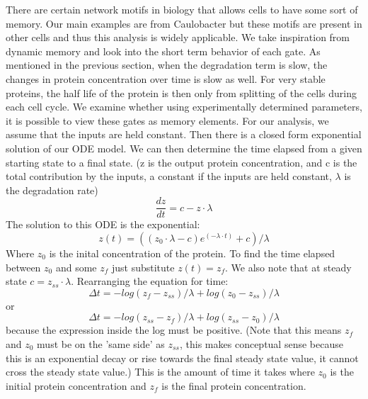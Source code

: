 \documentclass{article}
\begin{document}
There are certain network motifs in biology that allows cells to have some sort of memory.  Our main examples are from Caulobacter but these motifs are present in other cells and thus this analysis is widely applicable.  
We take inspiration from dynamic memory and look into the short term behavior of each gate.  As mentioned in the previous section, when the degradation term is slow, the changes in protein concentration over time is slow as well.  For very stable proteins, the half life of the protein is then only from splitting of the cells during each cell cycle.  We examine whether using experimentally determined parameters, it is possible to view these gates as memory elements.  For our analysis, we assume that the inputs are held constant.  Then there is a closed form exponential solution of our ODE model.  We can then determine the time elapsed from a given starting state to a final state.  (z is the output protein concentration, and c is the total contribution by the inputs, a constant if the inputs are held constant, $\lambda$ is the degradation rate)
\[\frac{dz}{dt}=c-z\cdot\lambda
\]
The solution to this ODE is the exponential:
\[z(t)=((z_0\cdot\lambda-c)e^{(-\lambda\cdot t)}+c)/\lambda
\]
Where $z_0$ is the inital concentration of the protein.  To find the time elapsed between $z_0$ and some $z_f$ just substitute $z(t)=z_f$.  We also note that at steady state $c=z_{ss}\cdot\lambda$.  Rearranging the equation for time:
\[\Delta t= -log(z_f-z_{ss})/ \lambda+ log(z_0-z_{ss})/ \lambda
\]
or
\[\Delta t= -log(z_{ss}-z_f)/ \lambda+ log(z_{ss}-z_0)/ \lambda
\]
because the expression inside the log must be positive.  (Note that this means $z_f$ and $z_0$ must be on the 'same side' as $z_{ss}$, this makes conceptual sense because this is an exponential decay or rise towards the final steady state value, it cannot cross the steady state value.)
 This is the amount of time it takes where $z_0$ is the initial protein concentration and $z_f$ is the final protein concentration.
\newline
\end{document}
